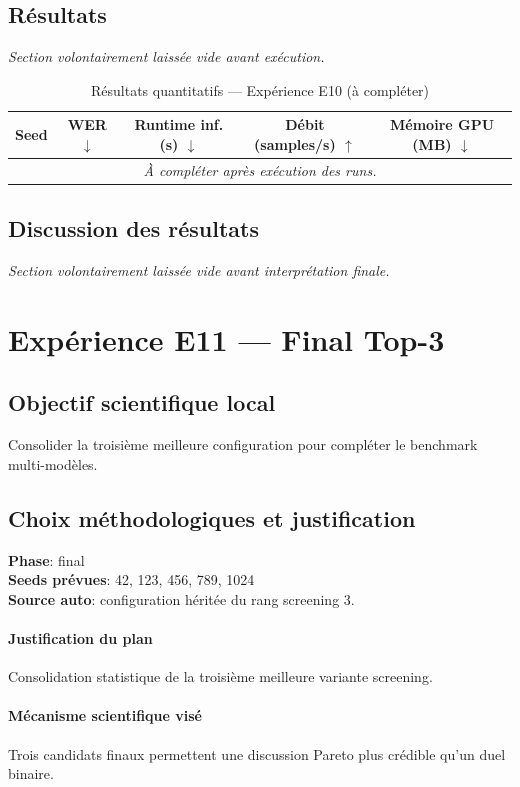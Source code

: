 \documentclass[11pt,a4paper]{article}
\begin{document}
\subsection{Résultats}
\textit{Section volontairement laissée vide avant exécution.}

\begin{table}[H]
\centering
\caption{Résultats quantitatifs --- Expérience E10 (à compléter)}
\begin{tabular}{lcccc}
\toprule
Seed & WER $\downarrow$ & Runtime inf. (s) $\downarrow$ & Débit (samples/s) $\uparrow$ & Mémoire GPU (MB) $\downarrow$ \\
\midrule
\multicolumn{5}{c}{\textit{À compléter après exécution des runs.}} \\
\bottomrule
\end{tabular}
\end{table}

\subsection{Discussion des résultats}
\textit{Section volontairement laissée vide avant interprétation finale.}


\section{Expérience E11 --- Final Top-3}
\subsection{Objectif scientifique local}
Consolider la troisième meilleure configuration pour compléter le benchmark multi-modèles.

\subsection{Choix méthodologiques et justification}
\textbf{Phase}: final\\
\textbf{Seeds prévues}: 42, 123, 456, 789, 1024\\
\textbf{Source auto}: configuration héritée du rang screening 3.

\paragraph{Justification du plan}
Consolidation statistique de la troisième meilleure variante screening.

\paragraph{Mécanisme scientifique visé}
Trois candidats finaux permettent une discussion Pareto plus crédible qu'un duel binaire.
\end{document}
